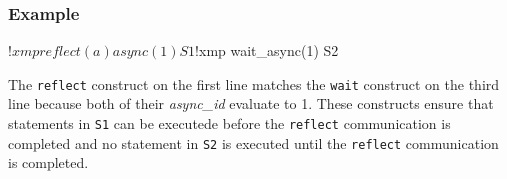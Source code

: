 \subsubsection*{Example}

\begin{Fexample}
!$xmp reflect (a) async(1)
      S1
!$xmp wait_async(1)
      S2
\end{Fexample}

The {\tt reflect} construct on the first line matches
the {\tt wait} construct on the third line because both of their {\it
async\_id} evaluate to 1.
%
These constructs ensure that statements in {\tt S1} can be executede
before the {\tt reflect} communication is completed and no statement in
{\tt S2} is executed until the {\tt reflect} communication is
completed.
